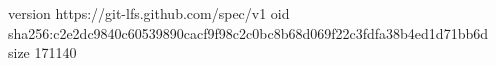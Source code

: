 version https://git-lfs.github.com/spec/v1
oid sha256:c2e2dc9840c60539890cacf9f98c2c0bc8b68d069f22c3fdfa38b4ed1d71bb6d
size 171140
